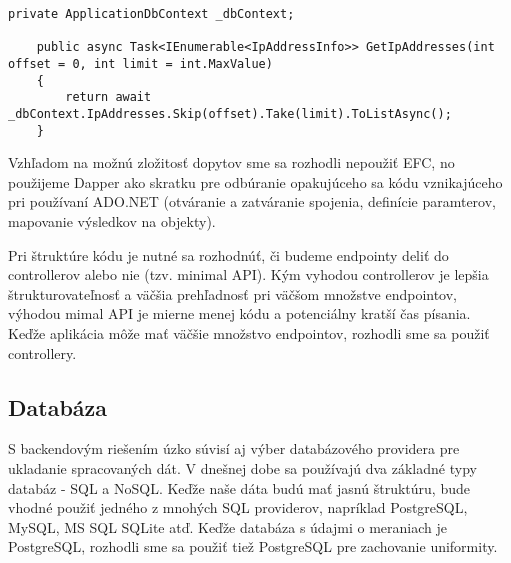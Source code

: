 \begin{lstlisting}[float,language={[Sharp]C},caption={Ukážka kódu pre ten istý dopyt pomocou rôznych knižníc - EFC},label=alg:Ukazka_EFC]
    private ApplicationDbContext _dbContext;

    public async Task<IEnumerable<IpAddressInfo>> GetIpAddresses(int offset = 0, int limit = int.MaxValue)
    {
        return await _dbContext.IpAddresses.Skip(offset).Take(limit).ToListAsync();
    }
\end{lstlisting}

Vzhľadom na možnú zložitosť dopytov sme sa rozhodli nepoužiť EFC, no použijeme Dapper ako skratku pre odbúranie opakujúceho sa kódu vznikajúceho 
pri používaní ADO.NET (otváranie a zatváranie spojenia, definície paramterov, mapovanie výsledkov na objekty).

Pri štruktúre kódu je nutné sa rozhodnúť, či budeme endpointy deliť do controllerov alebo nie (tzv. minimal API). Kým vyhodou controllerov je lepšia 
štrukturovateľnosť a väčšia prehľadnosť pri väčšom množstve endpointov, výhodou mimal API je mierne menej kódu a potenciálny kratší čas písania. Keďže 
aplikácia môže mať väčšie množstvo endpointov, rozhodli sme sa použiť controllery.

\subsection{Databáza}

S backendovým riešením úzko súvisí aj výber databázového providera pre ukladanie spracovaných dát. V dnešnej dobe sa používajú dva základné typy databáz 
- SQL a NoSQL. Keďže naše dáta budú mať jasnú štruktúru, bude vhodné použiť jedného z mnohých SQL providerov, napríklad PostgreSQL, MySQL, MS SQL SQLite atď. 
Keďže databáza s údajmi o meraniach je PostgreSQL, rozhodli sme sa použiť tiež PostgreSQL pre zachovanie uniformity.
